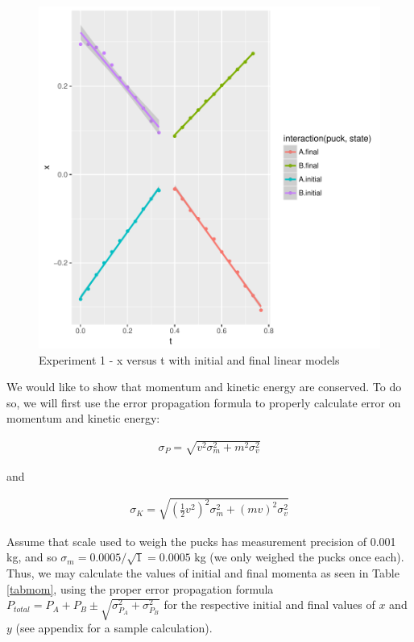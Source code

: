 \documentclass[11pt]{article}
\begin{document}
\begin{figure}[!h]
\includegraphics{lab5-v1-fig-exp-1xsmooth}
  \caption{Experiment 1 - x versus t with initial and final linear models}
  \label{exp-exp-1xsmooth}
\end{figure}

We would like to show that momentum and kinetic energy are conserved. To do so, we will first use the error propagation formula to properly calculate error on momentum and kinetic energy:

\begin{align}
\sigma_{P} = \sqrt{v^2\sigma_m^2+m^2\sigma_v^2}
\end{align}

and

\begin{align}
\sigma_{K} = \sqrt{\left(\frac{1}{2}v^2\right)^2\sigma_m^2+(mv)^2\sigma_v^2}
\end{align}

Assume that scale used to weigh the pucks has measurement precision of 0.001 kg, and so $\sigma_m=0.0005/\sqrt{1}=0.0005$ kg (we only weighed the pucks once each). Thus, we may calculate the values of initial and final momenta as seen in Table \ref{tabmom}, using the proper error propagation formula $P_{total} = P_A + P_B \pm \sqrt{\sigma_{P_A}^2+\sigma_{P_B}^2}$ for the respective initial and final values of $x$ and $y$ (see appendix for a sample calculation).
\end{document}
